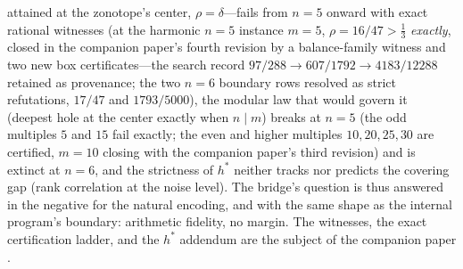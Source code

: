 \documentclass[11pt,a4paper]{article}
\numberwithin{equation}{section}
\theoremstyle{plain}
\theoremstyle{plain}
\theoremstyle{definition}
\theoremstyle{remark}
\begin{document}
\begin{enumerate}[leftmargin=1.7em,itemsep=4pt]
  attained at the zonotope's center, $\rho=\delta$---fails from $n=5$
  onward with exact rational witnesses (at the harmonic $n=5$ instance
  $m=5$, $\rho=16/47>\tfrac13$ \emph{exactly}, closed in the companion
  paper's fourth revision by a balance-family witness and two new box
  certificates---the search record
  $97/288\to607/1792\to4183/12288$ retained as provenance; the two
  $n=6$ boundary rows resolved as strict refutations, $17/47$ and
  $1793/5000$), the modular law that would
  govern it (deepest hole at the center exactly when $n\mid m$) breaks
  at $n=5$ (the odd multiples $5$ and $15$ fail exactly; the even and
  higher multiples $10,20,25,30$ are certified, $m=10$ closing with
  the companion paper's third revision) and is extinct at $n=6$, and
  the strictness of $h^*$ neither
  tracks nor predicts the covering gap (rank correlation at the noise
  level). The bridge's question is thus answered in the negative for
  the natural encoding, and with the same shape as the internal
  program's boundary: arithmetic fidelity, no margin. The witnesses,
  the exact certification ladder, and the $h^*$ addendum are the
  subject of the companion paper \cite{companion-paper}.
\end{enumerate}


\end{document}
